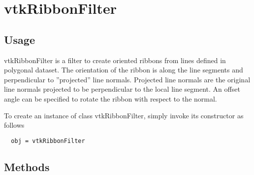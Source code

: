 \section{vtkRibbonFilter}

\subsection{Usage}

 vtkRibbonFilter is a filter to create oriented ribbons from lines defined
 in polygonal dataset. The orientation of the ribbon is along the line 
 segments and perpendicular to ''projected'' line normals. Projected line 
 normals are the original line normals projected to be perpendicular to 
 the local line segment. An offset angle can be specified to rotate the 
 ribbon with respect to the normal.


To create an instance of class vtkRibbonFilter, simply
invoke its constructor as follows
\begin{verbatim}
  obj = vtkRibbonFilter
\end{verbatim}
\subsection{Methods}

